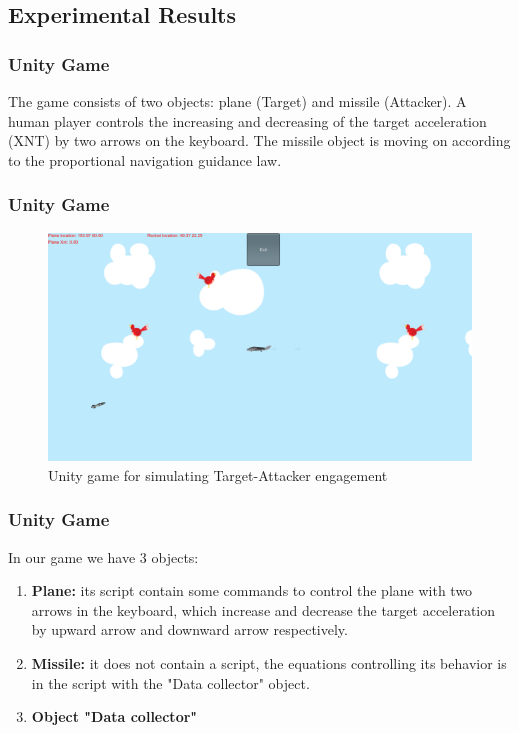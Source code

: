 \documentclass{beamer}
\begin{document}
\subsection{Experimental Results}
\begin{frame}
\frametitle{Unity Game}
The game consists of two objects: plane (Target) and missile (Attacker). A human player controls the increasing and decreasing of the target acceleration (XNT) by two arrows on the keyboard. The missile object is moving on according to the proportional navigation guidance law.
\end{frame}
\begin{frame}
\frametitle{Unity Game}
 \begin{figure}[H]
	\centering
	\includegraphics[scale = 0.2]{fig/unityGame.PNG}
	\caption{Unity game for simulating Target-Attacker engagement}
	\label{UnityGame}
\end{figure}
\end{frame}
\begin{frame}
\frametitle{Unity Game}
In our game we have 3 objects:
\begin{enumerate}
	\item \textbf{Plane:} its script contain some commands to control the plane with two arrows in the keyboard, which increase and decrease the target acceleration by upward arrow and downward arrow respectively. 
	\item \textbf{Missile:} it does not contain a script, the equations controlling its behavior is in the script with the "Data collector" object.
	\item \textbf{Object "Data collector"}
\end{enumerate} 
\end{frame}
\end{document}
